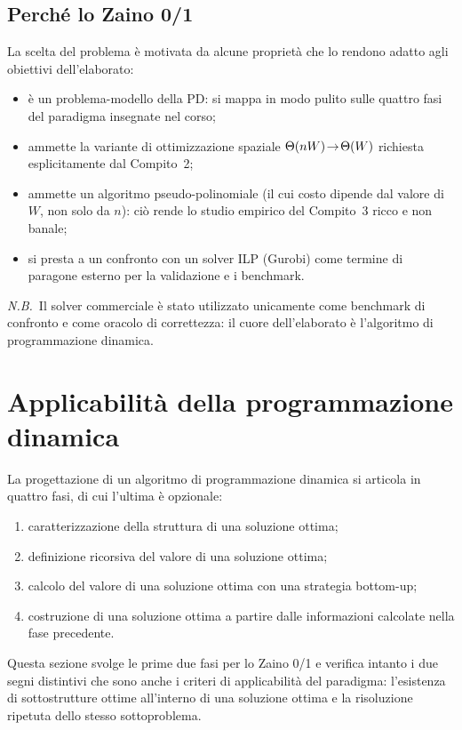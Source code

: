 \documentclass[11pt]{article}
\begin{document}
\subsection{Perch\'e lo Zaino 0/1}
La scelta del problema \`e motivata da alcune propriet\`a che lo rendono adatto
agli obiettivi dell'elaborato:
\begin{itemize}
  \item \`e un problema-modello della PD: si mappa in modo pulito sulle quattro
        fasi del paradigma insegnate nel corso;
  \item ammette la variante di ottimizzazione spaziale $\Theta(nW)\!\to\!\Theta(W)$
        richiesta esplicitamente dal Compito~2;
  \item ammette un algoritmo pseudo-polinomiale (il cui costo dipende dal
        valore di $W$, non solo da $n$): ci\`o rende lo studio empirico del Compito~3 ricco e non banale;
  \item si presta a un confronto con un solver ILP (Gurobi) come termine di
        paragone esterno per la validazione e i benchmark.
\end{itemize}

\medskip\noindent
\emph{N.B.}~Il solver commerciale \`e stato utilizzato unicamente come benchmark
di confronto e come oracolo di correttezza: il cuore dell'elaborato \`e
l'algoritmo di programmazione dinamica.

\section{Applicabilit\`a della programmazione dinamica}\label{sec:applicabilita}

La progettazione di un algoritmo di programmazione dinamica si articola in
quattro fasi, di cui l'ultima \`e opzionale:
\begin{enumerate}
  \item caratterizzazione della struttura di una soluzione ottima;
  \item definizione ricorsiva del valore di una soluzione ottima;
  \item calcolo del valore di una soluzione ottima con una strategia bottom-up;
  \item costruzione di una soluzione ottima a partire dalle informazioni
        calcolate nella fase precedente.
\end{enumerate}
Questa sezione svolge le prime due fasi per lo Zaino 0/1 e verifica intanto i
due segni distintivi che sono anche i criteri di applicabilit\`a del paradigma:
l'esistenza di sottostrutture ottime all'interno di una soluzione ottima e la
risoluzione ripetuta dello stesso sottoproblema.
\end{document}
